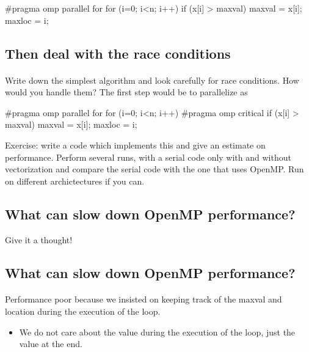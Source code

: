\documentclass[%
oneside,                 %
final,                   %
10pt]{article}
\begin{document}
{{{{\bcppcod
#pragma omp parallel for
 for (i=0; i<n; i++) {
    if (x[i] > maxval) {
      maxval = x[i];
      maxloc = i; 
    }
}

\ecppcod



\subsection{Then deal with the race conditions}

\paragraph{}
Write down the simplest algorithm and look carefully for race conditions. How would you handle them? 
The first step would be to parallelize as 











\bcppcod
#pragma omp parallel for
 for (i=0; i<n; i++) {
#pragma omp critical
  {
     if (x[i] > maxval) {
       maxval = x[i];
       maxloc = i; 
     }
  }
} 

\ecppcod


Exercise: write a code which implements this and give an estimate on performance. Perform several runs,
with a serial code only with and without vectorization and compare the serial code with the one that  uses OpenMP. Run on different archictectures if you can.


\subsection{What can slow down OpenMP performance?}
Give it a thought!

\subsection{What can slow down OpenMP performance?}

\paragraph{}
Performance poor because we insisted on keeping track of the maxval and location during the execution of the loop.
\begin{itemize}
 \item We do not care about the value during the execution of the loop, just the value at the end.
\end{itemize}

}}}}
\end{document}
